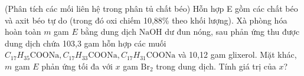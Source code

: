 \begin{vd}(Phân tích các mối liên hệ trong phân tủ chất béo)
	Hỗn hợp E gồm các chất béo và axit béo tự do (trong đó oxi chiếm 10,88\% theo khối lượng). Xà phòng hóa hoàn toàn $m$ gam $E$ bằng dung dịch $\mathrm{NaOH}$ dư đun nóng, sau phản ứng thu được dung dịch chứa 103,3
	gam hỗn hợp các muối $C_{17} H_{35} \mathrm{COONa}, C_{17} H_{33} \mathrm{COONa}, C_{17} H_{31} \mathrm{COONa}$ và 10,12 gam glixerol. Mặt khác, $m$ gam $E$ phản ứng tối đa với $x$ gam $\mathrm{Br}_2$ trong dung dịch. Tính giá trị của $x$?
	\loigiai{
	}
\end{vd}


